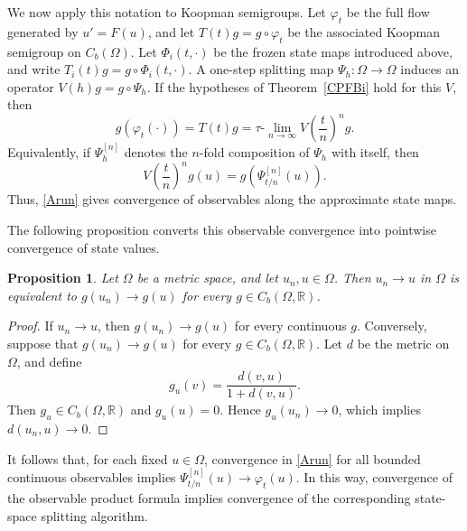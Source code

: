 \documentclass[preprint,1p,times,nopreprintline]{elsarticle}
\newtheorem{proposition}[theorem]{Proposition}
\begin{document}
We now apply this notation to Koopman semigroups. Let $\varphi_t$ be the full flow generated by $u'=F(u)$, and let $T(t)g=g\circ\varphi_t$ be the associated Koopman semigroup on $C_b(\Omega)$. Let $\Phi_i(t,\cdot)$ be the frozen state maps introduced above, and write $T_i(t)g=g\circ\Phi_i(t,\cdot)$. A one-step splitting map $\Psi_h:\Omega\to\Omega$ induces an operator $V(h)g=g\circ\Psi_h$. If the hypotheses of Theorem~\ref{CPFBi} hold for this $V$, then
\begin{equation}
\label{Arun}
g(\varphi_t(\cdot))
=
T(t)g
=
\tau\text{-}\lim_{n\to\infty}
V\!\left(\frac{t}{n}\right)^n g .
\end{equation}
Equivalently, if $\Psi_h^{[n]}$ denotes the $n$-fold composition of $\Psi_h$ with itself, then
\[
V\!\left(\frac{t}{n}\right)^n g(u)
=
g\!\left(\Psi_{t/n}^{[n]}(u)\right).
\]
Thus, \eqref{Arun} gives convergence of observables along the approximate state maps.

The following proposition converts this observable convergence into pointwise convergence of state values.

\begin{proposition}
\label{Frank}
Let $\Omega$ be a metric space, and let $u_n,u\in\Omega$. Then $u_n\to u$ in $\Omega$ is equivalent to $g(u_n)\to g(u)$ for every $g\in C_b(\Omega,\mathbb{R})$.
\end{proposition}

\begin{proof}
If $u_n\to u$, then $g(u_n)\to g(u)$ for every continuous $g$. Conversely, suppose that $g(u_n)\to g(u)$ for every $g\in C_b(\Omega,\mathbb{R})$. Let $d$ be the metric on $\Omega$, and define
\[
g_u(v)=\frac{d(v,u)}{1+d(v,u)} .
\]
Then $g_u\in C_b(\Omega,\mathbb{R})$ and $g_u(u)=0$. Hence $g_u(u_n)\to 0$, which implies $d(u_n,u)\to 0$.
\end{proof}

It follows that, for each fixed $u\in\Omega$, convergence in \eqref{Arun} for all bounded continuous observables implies $\Psi_{t/n}^{[n]}(u)\to \varphi_t(u)$. In this way, convergence of the observable product formula implies convergence of the corresponding state-space splitting algorithm.
\end{document}
